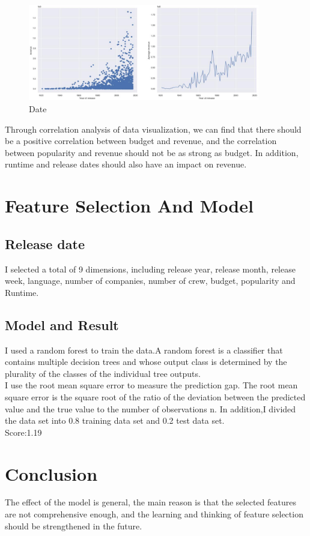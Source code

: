 \begin{figure}[htbp]
  \includegraphics[width=0.9\textwidth,height=0.5\textwidth]{./figures/year2.eps}
  \caption{Date}
\end{figure}

Through correlation analysis of data visualization,
we can find that there should be a positive correlation between budget and revenue,
and the correlation between popularity and revenue should not be as strong as budget.
In addition,
runtime and release dates should also have an impact on revenue.  \\


\section{Feature Selection And Model} \label{sec-preliminaries}
\subsection{Release date}
I selected a total of 9 dimensions,
including release year, release month, release week, language, number of companies, 
number of crew, budget, popularity and Runtime.  \\

\subsection{Model and Result}
I used a random forest to train the data.A random forest is a classifier that contains multiple decision trees and whose output class is
determined by the plurality of the classes of the individual tree outputs. \\
I use the root mean square error to measure the prediction gap.
The root mean square error is the square root of the ratio of the deviation between the predicted value and the true value to the number of observations n.
In addition,I divided the data set into 0.8 training data set and 0.2 test data set. \\
Score:1.19 \\

\section{Conclusion} \label{sec-preliminaries}
The effect of the model is general,
the main reason is that the selected features are not comprehensive enough,
and the learning and thinking of feature selection should be strengthened in the future.